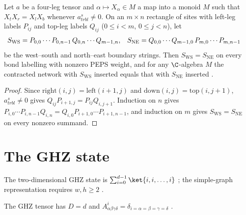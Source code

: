 \begin{lemma}%
    \label{lem:peps_torus_string_pull_through}
    \leanok
    Let $a$ be a four-leg tensor and $\alpha\mapsto X_\alpha\in M$ a map into a
    monoid $M$ such that $X_tX_r=X_lX_b$ whenever $a^{s}_{trbl}\neq0$. On an
    $m\times n$ rectangle of sites with left-leg labels $P_{ij}$ and top-leg
    labels $Q_{ij}$ ($0\le i<m$, $0\le j<n$), let
    \begin{align}
        S_{\mathrm{WS}} & = P_{0,0}\cdots P_{0,n-1}\,Q_{0,n}\cdots Q_{m-1,n}, &
        S_{\mathrm{NE}} & = Q_{0,0}\cdots Q_{m-1,0}\,P_{m,0}\cdots P_{m,n-1}
        \notag
    \end{align}
    be the west--south and north--east boundary strings. Then
    $S_{\mathrm{WS}}=S_{\mathrm{NE}}$ on every bond labelling with nonzero PEPS weight,
    and for any $\C$-algebra $M$ the contracted network with $S_{\mathrm{WS}}$
    inserted equals that with $S_{\mathrm{NE}}$ inserted
    \cite[Section~``MPO and PEPO'']{Cirac2021Matrix}.
\end{lemma}

\begin{proof}\leanok
    Since $\mathrm{right}(i,j)=\mathrm{left}(i+1,j)$ and
    $\mathrm{down}(i,j)=\mathrm{top}(i,j+1)$, $a^s_{trbl}\neq 0$ gives
    $Q_{ij}P_{i+1,j}=P_{ij}Q_{i,j+1}$. Induction on $n$ gives
    $P_{i,0}\cdots P_{i,n-1}Q_{i,n}=Q_{i,0}P_{i+1,0}\cdots P_{i+1,n-1}$, and
    induction on $m$ gives $S_{\mathrm{WS}}=S_{\mathrm{NE}}$ on every nonzero
    summand.
\end{proof}

\section{The GHZ state}%
\label{sec:peps_ghz}

The two-dimensional GHZ state is $\sum_{i=0}^{d-1}\ket{i,i,\ldots,i}$
\cite[Appendix~A, ``The GHZ state'']{Cirac2021Matrix}; the simple-graph
representation requires $w,h\ge 2$ \cite{gap:rmp_peps_examples_small_torus}.

\begin{definition}%
    \label{def:peps_ghz_tensor}
    \leanok
    The GHZ tensor has $D=d$ and
    $A^i_{\alpha\beta\gamma\delta}=\delta_{i=\alpha=\beta=\gamma=\delta}$
    \cite[Appendix~A, ``The GHZ state'']{Cirac2021Matrix}.
\end{definition}

